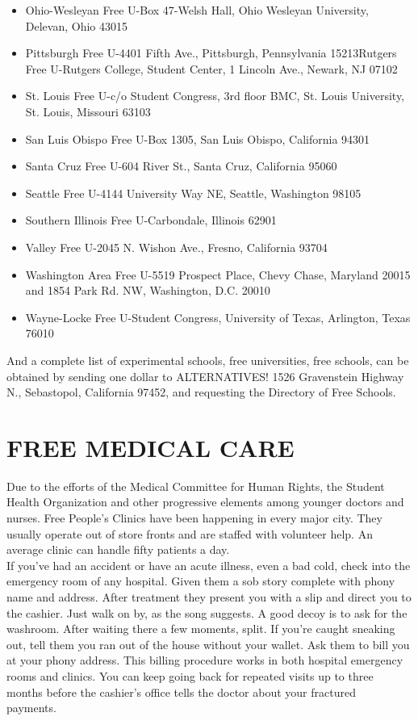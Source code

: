 \documentclass[11pt,twoside,a4paper]{book}
\begin{document}
\begin{small}
\begin{itemize}
	\item Ohio-Wesleyan Free U-Box 47-Welsh Hall, Ohio Wesleyan University, Delevan, Ohio 43015 
	\item Pittsburgh Free U-4401 Fifth Ave., Pittsburgh, Pennsylvania 15213Rutgers Free U-Rutgers College, Student Center, 1 Lincoln Ave., Newark, NJ 07102 		
	\item St. Louis Free U-c/o Student Congress, 3rd floor BMC, St. Louis University, St. Louis, Missouri 63103 
	\item San Luis Obispo Free U-Box 1305, San Luis Obispo, California 94301 
	\item Santa Cruz Free U-604 River St., Santa Cruz, California 95060 
	\item Seattle Free U-4144 University Way NE, Seattle, Washington 98105 
	\item Southern Illinois Free U-Carbondale, Illinois 62901 
	\item Valley Free U-2045 N. Wishon Ave., Fresno, California 93704
	\item Washington Area Free U-5519 Prospect Place, Chevy Chase, Maryland 20015 and 1854 Park Rd. NW, Washington, D.C. 20010 
	\item Wayne-Locke Free U-Student Congress, University of Texas, Arlington, Texas 76010
\end{itemize} \end{small}

And a complete list of experimental schools, free universities, free schools, can be obtained by sending one dollar to ALTERNATIVES! 1526 Gravenstein Highway N., Sebastopol, California 97452, and requesting the Directory of Free Schools.

\section{FREE MEDICAL CARE}
	Due to the efforts of the Medical Committee for Human Rights, the Student Health Organization and other progressive elements among younger doctors and nurses. Free People's Clinics have been happening in every major city. They usually operate out of store fronts and are staffed with volunteer help. An average clinic can handle fifty patients a day.~\\

If you've had an accident or have an acute illness, even a bad cold, check into the emergency room of any hospital. Given them a sob story complete with phony name and address. After treatment they present you with a slip and direct you to the cashier. Just walk on by, as the song suggests. A good decoy is to ask for the washroom. After waiting there a few moments, split. If you're caught sneaking out, tell them you ran out of the house without your wallet. Ask them to bill you at your phony address. This billing procedure works in both hospital emergency rooms and clinics. You can keep going back for repeated visits up to three months before the cashier's office tells the doctor about your fractured payments.~\\
\end{document}
